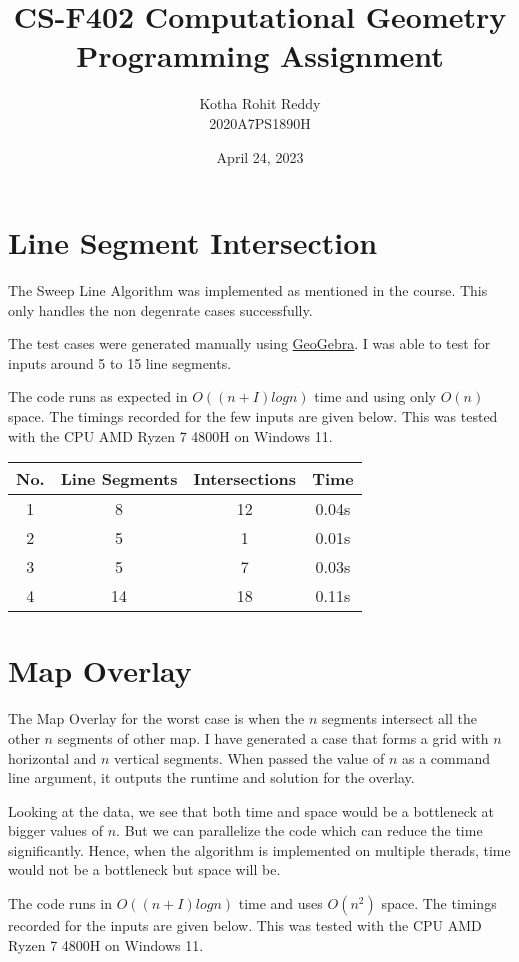 \documentclass[11pt]{article}
\title{CS-F402 Computational Geometry \\ Programming Assignment}
\author{Kotha Rohit Reddy \\ 2020A7PS1890H}
\date{April 24, 2023}
\begin{document}
\maketitle

\section{Line Segment Intersection}
\par The Sweep Line Algorithm was implemented as mentioned in the course.
This only handles the non degenrate cases successfully.
\par The test cases were generated manually using \href{https://www.geogebra.org/m/VWN3g9rE}{GeoGebra}.
I was able to test for inputs around 5 to 15 line segments.
\par The code runs as expected in $O((n + I)log{}n)$ time and using only $O(n)$ space.
The timings recorded for the few inputs are given below.
This was tested with the CPU AMD Ryzen 7 4800H on Windows 11.

\begin{center}
    \begin{tabular}{c | c | c | c }
        No. & Line Segments & Intersections & Time  \\
        \hline %
        1   & 8             & 12            & 0.04s \\
        2   & 5             & 1             & 0.01s \\
        3   & 5             & 7             & 0.03s \\
        4   & 14            & 18            & 0.11s \\
    \end{tabular}
\end{center}

\section{Map Overlay}
\par The Map Overlay for the worst case is when the $n$ segments intersect all the other $n$ segments of other map.
I have generated a case that forms a grid with $n$ horizontal and $n$ vertical segments.
When passed the value of $n$ as a command line argument, it outputs the runtime and solution for the overlay.
\par Looking at the data, we see that both time and space would be a bottleneck at bigger values of $n$.
But we can parallelize the code which can reduce the time significantly.
Hence, when the algorithm is implemented on multiple therads, time would not be a bottleneck but space will be.
\par The code runs in $O((n + I)log{}n)$ time and uses $O(n^2)$ space.
The timings recorded for the inputs are given below.
This was tested with the CPU AMD Ryzen 7 4800H on Windows 11.
\end{document}
